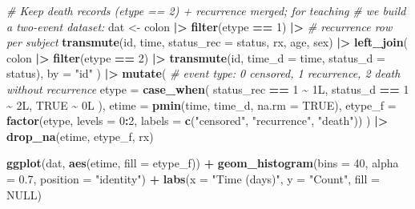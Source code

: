 \documentclass[
]{article}
\newenvironment{Shaded}{\begin{snugshade}}{\end{snugshade}}
\newcommand{\AttributeTok}[1]{\textcolor[rgb]{0.13,0.29,0.53}{#1}}
\newcommand{\CommentTok}[1]{\textcolor[rgb]{0.56,0.35,0.01}{\textit{#1}}}
\newcommand{\ConstantTok}[1]{\textcolor[rgb]{0.56,0.35,0.01}{#1}}
\newcommand{\DataTypeTok}[1]{\textcolor[rgb]{0.13,0.29,0.53}{#1}}
\newcommand{\DecValTok}[1]{\textcolor[rgb]{0.00,0.00,0.81}{#1}}
\newcommand{\FloatTok}[1]{\textcolor[rgb]{0.00,0.00,0.81}{#1}}
\newcommand{\FunctionTok}[1]{\textcolor[rgb]{0.13,0.29,0.53}{\textbf{#1}}}
\newcommand{\NormalTok}[1]{#1}
\newcommand{\OtherTok}[1]{\textcolor[rgb]{0.56,0.35,0.01}{#1}}
\newcommand{\SpecialCharTok}[1]{\textcolor[rgb]{0.81,0.36,0.00}{\textbf{#1}}}
\newcommand{\StringTok}[1]{\textcolor[rgb]{0.31,0.60,0.02}{#1}}
\begin{document}
\begin{Shaded}
\begin{Highlighting}[]
\CommentTok{\# Keep death records (etype == 2) + recurrence merged; for teaching}
\CommentTok{\# we build a two{-}event dataset:}
\NormalTok{dat }\OtherTok{\textless{}{-}}\NormalTok{ colon }\SpecialCharTok{|\textgreater{}}
  \FunctionTok{filter}\NormalTok{(etype }\SpecialCharTok{==} \DecValTok{1}\NormalTok{) }\SpecialCharTok{|\textgreater{}}                       \CommentTok{\# recurrence row per subject}
  \FunctionTok{transmute}\NormalTok{(id, time, }\AttributeTok{status\_rec =}\NormalTok{ status,}
\NormalTok{            rx, age, sex) }\SpecialCharTok{|\textgreater{}}
  \FunctionTok{left\_join}\NormalTok{(}
\NormalTok{    colon }\SpecialCharTok{|\textgreater{}} \FunctionTok{filter}\NormalTok{(etype }\SpecialCharTok{==} \DecValTok{2}\NormalTok{) }\SpecialCharTok{|\textgreater{}}
      \FunctionTok{transmute}\NormalTok{(id, }\AttributeTok{time\_d =}\NormalTok{ time, }\AttributeTok{status\_d =}\NormalTok{ status),}
    \AttributeTok{by =} \StringTok{"id"}
\NormalTok{  ) }\SpecialCharTok{|\textgreater{}}
  \FunctionTok{mutate}\NormalTok{(}
    \CommentTok{\# event type: 0 censored, 1 recurrence, 2 death without recurrence}
    \AttributeTok{etype =} \FunctionTok{case\_when}\NormalTok{(}
\NormalTok{      status\_rec }\SpecialCharTok{==} \DecValTok{1} \SpecialCharTok{\textasciitilde{}} \DecValTok{1}\DataTypeTok{L}\NormalTok{,}
\NormalTok{      status\_d   }\SpecialCharTok{==} \DecValTok{1} \SpecialCharTok{\textasciitilde{}} \DecValTok{2}\DataTypeTok{L}\NormalTok{,}
      \ConstantTok{TRUE}            \SpecialCharTok{\textasciitilde{}} \DecValTok{0}\DataTypeTok{L}
\NormalTok{    ),}
    \AttributeTok{etime =} \FunctionTok{pmin}\NormalTok{(time, time\_d, }\AttributeTok{na.rm =} \ConstantTok{TRUE}\NormalTok{),}
    \AttributeTok{etype\_f =} \FunctionTok{factor}\NormalTok{(etype, }\AttributeTok{levels =} \DecValTok{0}\SpecialCharTok{:}\DecValTok{2}\NormalTok{,}
                     \AttributeTok{labels =} \FunctionTok{c}\NormalTok{(}\StringTok{"censored"}\NormalTok{, }\StringTok{"recurrence"}\NormalTok{, }\StringTok{"death"}\NormalTok{))}
\NormalTok{  ) }\SpecialCharTok{|\textgreater{}}
  \FunctionTok{drop\_na}\NormalTok{(etime, etype\_f, rx)}

\FunctionTok{ggplot}\NormalTok{(dat, }\FunctionTok{aes}\NormalTok{(etime, }\AttributeTok{fill =}\NormalTok{ etype\_f)) }\SpecialCharTok{+}
  \FunctionTok{geom\_histogram}\NormalTok{(}\AttributeTok{bins =} \DecValTok{40}\NormalTok{, }\AttributeTok{alpha =} \FloatTok{0.7}\NormalTok{, }\AttributeTok{position =} \StringTok{"identity"}\NormalTok{) }\SpecialCharTok{+}
  \FunctionTok{labs}\NormalTok{(}\AttributeTok{x =} \StringTok{"Time (days)"}\NormalTok{, }\AttributeTok{y =} \StringTok{"Count"}\NormalTok{, }\AttributeTok{fill =} \ConstantTok{NULL}\NormalTok{)}
\end{Highlighting}
\end{Shaded}
\end{document}
